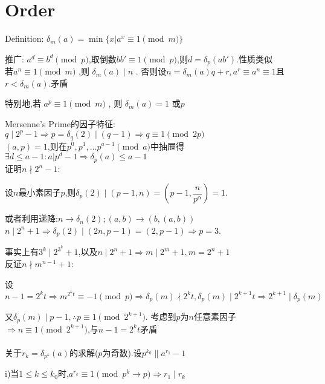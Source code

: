 
\section{Order}
Definition: $  \delta_m(a)=\min \{x|a^x \equiv 1 \pmod m\} $ 

推广: $ a^d\equiv b^d \pmod p$,取倒数$ bb'\equiv1\pmod p$,则$ d=\delta_p(ab')$.性质类似
\\
若$ a^n \equiv 1 \pmod m$ ,则 $ \delta_m(a)\mid n $ .
否则设$ n=\delta_m(a)q+r,a^r \equiv a^n \equiv 1 $且$ r<\delta_m(a)$.矛盾

特别地,若 $ a^p\equiv 1 \pmod m$ , 则 $ \delta_m(a)=1 $ 或$ p$ 

Mersenne's Prime的因子特征:$ q\mid 2^p-1\Rightarrow p=\delta_q(2)\mid (q-1)\Rightarrow q\equiv 1 \pmod{2p} $ 
\\

$ (a,p)=1$,则在$ p^0,p^1,\ldots p^{a-1} \pmod a$中抽屉得 $ \exists d \le a-1: a|p^d-1\Rightarrow \delta_p(a)\le a-1$
\\

证明$ n \nmid 2^n-1$:

设$ n$最小素因子$ p$,则$ \delta_p(2) \mid (p-1,n)=(p-1,\dfrac{n}{p^{\alpha}})=1$.

或者利用递降:$ n\rightarrow \delta_n(2) ; (a,b)\rightarrow (b,(a,b))$
\\

$ n\mid 2^n+1\Rightarrow \delta_p(2)\mid (2n,p-1)=(2,p-1)\Rightarrow p=3$.

事实上有$ 3^k \mid 2^{3^k}+1$,以及$ n\mid 2^n+1 \Rightarrow m\mid 2^m+1,m=2^n+1$
\\

反证$ n \nmid m^{n-1}+1$:

设$ n-1=2^kt\Rightarrow m^{2^kt}\equiv -1 \pmod p\Rightarrow \delta_p(m)\nmid 2^kt,\delta_p(m)\mid 2^{k+1}t\Rightarrow 2^{k+1}\mid\delta_p(m)$

又$ \delta_p(m)\mid p-1,\therefore p \equiv 1 \pmod{2^{k+1}}.$
考虑到$ p$为$ n$任意素因子$ \Rightarrow n\equiv 1 \pmod{2^{k+1}}$,与$ n-1=2^kt$矛盾
\\
\\

关于$ r_k=\delta_{p^k}(a)$的求解($ p$为奇数).设$ p^{k_0}\parallel a^{r_1}-1$

i)当$ 1\le k \le k_0$时,$ a^{r_k}\equiv1 \pmod{p^k \rightarrow p}\Rightarrow r_1\mid r_k$

